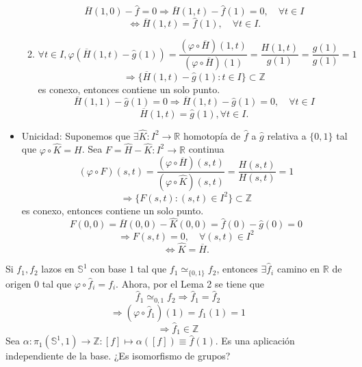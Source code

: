 \begin{dem}
\begin{itemize}
\begin{enumerate}[label=(\roman*)]
          \[ 
            \overline{H}(1,0) - \hat{f} = 0 \Rightarrow \overline{H}(1, t) - \hat{ f }(1) = 0, \quad \forall t \in I
          \] 
          \[ 
            \Leftrightarrow \overline{H}(1, t) = \hat{ f }(1), \quad \forall t \in I.
          \] 
        \item
          \[ 
            \forall t \in I, \varphi(\overline{H}(1, t) - \hat{ g }(1)) = \frac{(\varphi \circ \overline{H})(1, t)}{(\varphi \circ \overline{H})(1)} = \frac{H(1,t)}{g(1)} = \frac{g(1)}{g(1)} = 1 
          \] 
          \[ 
            \Rightarrow \{ \overline{H}(1,t) - \hat{ g }(1) : t \in I \} \subset \mathbb{Z}
          \] 
          es conexo, entonces contiene un solo punto.
          \[ 
            \overline{H}(1, 1) - \hat{ g }(1) = 0 \Rightarrow \overline{H}(1,t) - \hat{ g }(1) = 0, \quad \forall t \in I
          \] 
          \[ 
            \overline{H}(1, t) = \hat{ g }(1), \forall t \in I.
          \] 
      \end{enumerate}

    \item Unicidad: Suponemos que $\exists \hat{ K } : I^{2} \to \mathbb{R}$ homotopía de $\hat{ f }$ a $\hat{ g }$ relativa a $\{ 0, 1 \}$ tal que $\varphi \circ \hat{ K } = H$. Sea $F = \hat{ H } - \hat{ K } : I^{2} \to \mathbb{R}$ continua
      \[ 
        (\varphi \circ F)(s,t) = \frac{(\varphi \circ \overline{H})(s,t)}{(\varphi \circ \hat{ K })(s,t)} = \frac{H(s,t)}{H(s,t)} = 1
      \] 
      \[ 
        \Rightarrow \{ F(s,t) : (s,t) \in I^{2} \} \subset \mathbb{Z} 
      \] 
      es conexo, entonces contiene un solo punto.
      \[ 
        F(0,0) = \overline{H}(0,0) - \hat{ K }(0, 0) = \hat{ f }(0) - \hat{ g }(0) = 0
      \] 
      \[ 
        \Rightarrow F(s,t) = 0, \quad \forall (s,t) \in I^{2}   
      \] 
      \[ 
        \Leftrightarrow \hat{ K } = \overline{H}.
      \] 
  \end{itemize}
\end{dem}

\begin{obs}
  Si $f_{1}, f_{2}$ lazos en $\mathbb{S}^{1}$ con base $1$ tal que $f_{1} \simeq_{\{ 0,1 \}}f_{2}$, entonces $\exists \hat{ f }_{i}$ camino en $\mathbb{R}$ de origen $0$ tal que $\varphi \circ \hat{ f }_{i} = f_{i}$. Ahora, por el Lema 2 se tiene que
  \[
    \hat{ f }_{1} \simeq_{0, 1} f_{2} \Rightarrow \hat{ f }_{1} = \hat{ f }_{2}
  \]
  \[ 
    \Rightarrow (\varphi \circ \hat{ f }_{1})(1) = f_{1}(1) = 1 
  \] 
  \[ 
    \Rightarrow \hat{ f }_{1} \in \mathbb{Z}
  \] 
  Sea $\alpha : \pi_{1}(\mathbb{S}^{1}, 1) \to \mathbb{Z}: [ f ] \mapsto \alpha([ f ]) \equiv \hat{ f }(1)$. Es una aplicación independiente de la base. ¿Es isomorfismo de grupos?
\end{obs}

